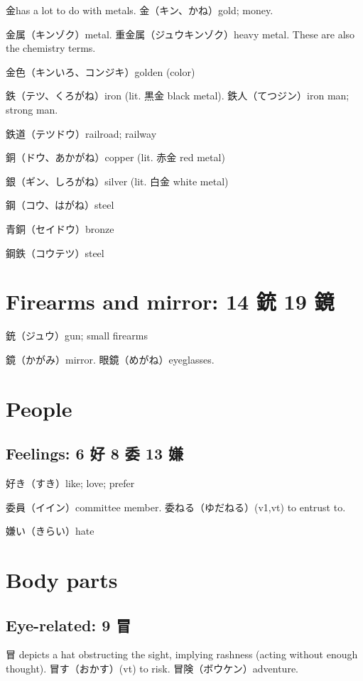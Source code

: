 金has a lot to do with metals.
金（キン、かね）gold; money.

金属（キンゾク）metal.
重金属（ジュウキンゾク）heavy metal.
These are also the chemistry terms.

金色（キンいろ、コンジキ）golden (color)

鉄（テツ、くろがね）iron (lit. 黒金 black metal).
鉄人（てつジン）iron man; strong man.

鉄道（テツドウ）railroad; railway

銅（ドウ、あかがね）copper (lit. 赤金 red metal)

銀（ギン、しろがね）silver (lit. 白金 white metal)

鋼（コウ、はがね）steel

青銅（セイドウ）bronze

鋼鉄（コウテツ）steel

\section{Firearms and mirror: 14 銃 19 鏡}

銃（ジュウ）gun; small firearms

鏡（かがみ）mirror.
眼鏡（めがね）eyeglasses.

\section{People}

\subsection{Feelings: 6 好 8 委 13 嫌}

好き（すき）like; love; prefer

委員（イイン）committee member.
委ねる（ゆだねる）(v1,vt) to entrust to.

嫌い（きらい）hate

\section{Body parts}

\subsection{Eye-related: 9 冒}

冒 depicts a hat obstructing the sight, implying rashness
(acting without enough thought).
冒す（おかす）(vt) to risk.
冒険（ボウケン）adventure.

